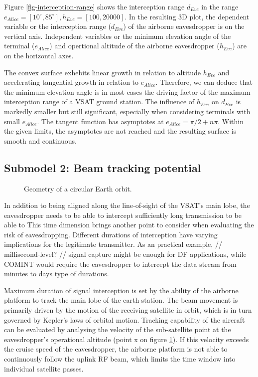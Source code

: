 \documentclass[english, 12pt, a4paper, elec, utf8, a-1b, online]{aaltothesis}
\begin{document}
Figure \ref{fig-interception-range} shows the interception range $d_{Eve}$ in the range $e_{Alice} = [10^\circ, 85^\circ], h_{Eve} = [100,20000]$.
In the resulting 3D plot, the dependent variable or the interception range ($d_{Eve}$) of the airborne eavesdropper is on the vertical axis.
Independent variables or the minimum elevation angle of the terminal ($e_{Alice}$) and opertional altitude of the airborne eavesdropper ($h_{Eve}$) are on the horizontal axes.

The convex surface exhebits linear growth in relation to altitude $h_{Eve}$ and accelerating tangential growth in relation to $e_{Alice}$.
Therefore, we can deduce that the minimum elevation angle is in most cases the driving factor of the maximum interception range of a VSAT ground station.
The influence of $h_{Eve}$ on $d_{Eve}$ is markedly smaller but still significant, especially when considering terminals with small $e_{Alice}$.
The tangent function has asymptotes at $e_{Alice} = \pi / 2 + n\pi$. Within the given limits, the asymptotes are not reached and the resulting surface is smooth and continuous.


\subsection{Submodel 2: Beam tracking potential}

\begin{figure}[h]
  \centering
  
  \caption{Geometry of a circular Earth orbit.}
  \label{fig-orbit-geometry}
\end{figure}

In addition to being aligned along the line-of-sight of the VSAT's main lobe, the eavesdropper needs to be able to intercept sufficiently long transmission to be able to %
This time dimension brings another point to consider when evaluating the risk of eavesdropping.
Different durations of interception have varying implications for the legitimate transmitter.
As an practical example, // millisecond-level? // signal capture might be enough for DF applications, while COMINT would require the eavesdropper to intercept the data stream from minutes to days type of durations.

Maximum duration of signal interception is set by the ability of the airborne platform to track the main lobe of the earth station.
The beam movement is primarily driven by the motion of the receiving satellite in orbit, which is in turn governed by Kepler's laws of orbital motion.
Tracking capability of the aircraft can be evaluated by analysing the velocity of the sub-satellite point at the eavesdropper's operational altitude (point x on figure \ref{fig-orbit-geometry}).
If this velocity exceeds the cruise speed of the eavesdropper, the airborne platform is not able to continuously follow the uplink RF beam, which limits the time window into individual satellite passes.
\end{document}
